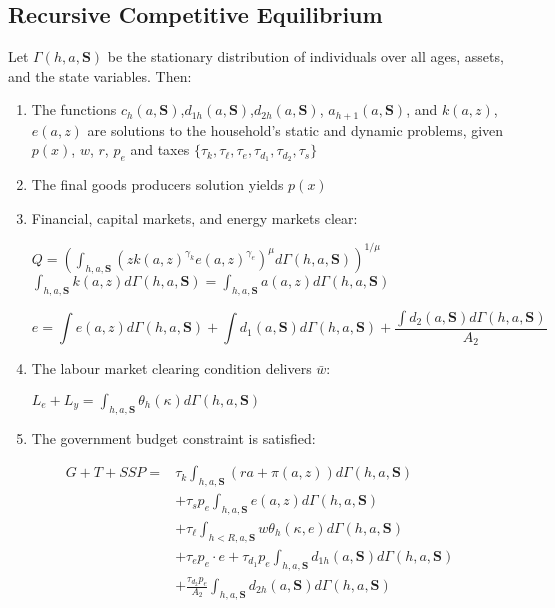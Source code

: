 \documentclass[12pt,a4paper]{article}
\begin{document}
\subsection{\normalsize Recursive Competitive Equilibrium}	
Let $\Gamma(h,a,\textbf{S})$ be the stationary distribution of individuals over all ages, assets, and the state variables. Then:
	\begin{enumerate}
	
        \item The functions $c_h(a, \textbf{S})$,$d_{1h}(a, \textbf{S})$,$d_{2h}(a, \textbf{S})$, $a_{h+1}(a, \textbf{S})$, and $k(a, z)$, $e(a, z)$ are solutions to the household's static and dynamic problems, given $p(x)$, $w$, $r$, $p_e$ and taxes $\{\tau_k, \tau_\ell, \tau_e, \tau_{d_1},\tau_{d_2}, \tau_{s} \}$
        
        \item The final goods producers solution yields $p(x)$ 
        
        \item Financial, capital markets, and energy markets clear:
        
   \begin{center}
        $Q = (\int_{h,a,\textbf{S}}(z  k(a,z)^{\gamma_k} e(a,z)^{\gamma_e})^\mu d\Gamma(h,a,\textbf{S}))^{1/\mu}$ 
                 $\int_{h,a,\textbf{S}}k(a,z)d\Gamma(h,a,\textbf{S})=\int_{h,a,\textbf{S}}a(a,z)d\Gamma(h,a,\textbf{S})$
                 
                 \[e=\int e(a,z)d\Gamma(h,a,\textbf{S})+\int d_{1}(a, \textbf{S}) d\Gamma(h,a,\textbf{S}) +\frac{\int d_{2}(a, \textbf{S}) d\Gamma(h,a,\textbf{S})}{A_2} \]
    
       
   \end{center}
   \item The labour market clearing condition delivers $\bar{w}$:
           
   \begin{center}
     $L_e+L_y=\int_{h, a, \textbf{S}} \theta_h(\kappa)d\Gamma(h,a,\textbf{S})$
             
   \end{center}

    \item The government budget constraint is satisfied:
  \end{enumerate}

    \[
\begin{array}{ll}


 G + T + SSP= &\tau_k \int_{h,a,\textbf{S}}(ra+\pi(a,z))d\Gamma(h,a,\textbf{S})\\ & + \tau_s p_e \int_{h,a,\textbf{S}}e(a,z)d\Gamma(h,a,\textbf{S})\\ & + \tau_\ell \int_{h<R,a,\textbf{S}}w\theta_h(\kappa, e)d\Gamma(h,a,\textbf{S}) \\&
       + \tau_e p_e \cdot e + \tau_{d_1} p_e  \int_{h,a,\textbf{S}} d_{1h}(a, \textbf{S})d\Gamma(h,a,\textbf{S}) \\&
+       
     \frac{\tau_{d_2} p_e }{A_2} \int_{h,a,\textbf{S}} d_{2h}(a, \textbf{S})d\Gamma(h,a,\textbf{S})

\end{array}
\]
\end{document}
